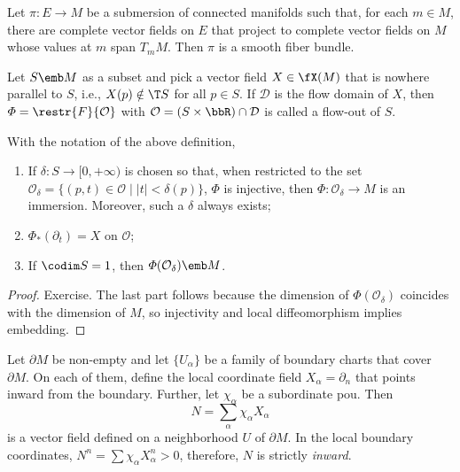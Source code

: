 \begin{cor}[Ehresmann (1951)]\label{thm Ehresmann vector fields}
    Let $\pi:E\to M$ be a submersion of connected manifolds such that, for each $m\in M$, there are complete vector fields on $E$ that project to complete vector fields on $M$ whose values at $m$ span $T_m M$. Then $\pi$ is a smooth fiber bundle.
\end{cor}



\begin{defn}
    Let $S\emb M$ as a subset and pick a vector field $X\in\fX(M)$ that is nowhere parallel to $S$, i.e., $X(p)\notin \T S$ for all $p\in S$. If $\mathcal{D}$ is the flow domain of $X$, then $\varPhi=\restr{F}{\mathcal{O}}$ with $\mathcal{O}=(S\times\bbR )\cap \mathcal{D}$ is called a flow-out of $S$.
\end{defn}

\begin{thm}
    With the notation of the above definition,
    \begin{enumerate}
        \item If $\delta:S\to [0,+\infty)$ is chosen so that, when restricted to the set $\mathcal{O}_\delta=\{(p,t)\in\mathcal{O}\mid |t|<\delta(p)\}$, $\varPhi$ is injective, then $\varPhi:\mathcal{O}_\delta\to M$ is an immersion. Moreover, such a $\delta$ always exists;
        \item $\varPhi_\ast (\partial_t)=X$ on $\mathcal{O}$;
        \item If $\codim S=1$, then $\varPhi(\mathcal{O}_\delta)\emb M$.
    \end{enumerate}
\end{thm}
\begin{proof}
    Exercise. The last part follows because the dimension of $\varPhi(\mathcal{O}_\delta)$ coincides with the dimension of $M$, so injectivity and local diffeomorphism implies embedding.
\end{proof}

Let $\partial M$ be non-empty and let $\{U_\alpha\}$ be a family of boundary charts that cover $\partial M$. On each of them, define the local coordinate field $X_\alpha=\partial_n$ that points inward from the boundary. Further, let $\chi_\alpha$ be a subordinate \gls{pou}. Then 
\[N=\sum_\alpha \chi_\alpha X_\alpha\]
is a vector field defined on a neighborhood $U$ of $\partial M$. In the local boundary coordinates, $N^n=\sum \chi_\alpha X_\alpha^n>0$, therefore, $N$ is strictly \emph{inward}.

